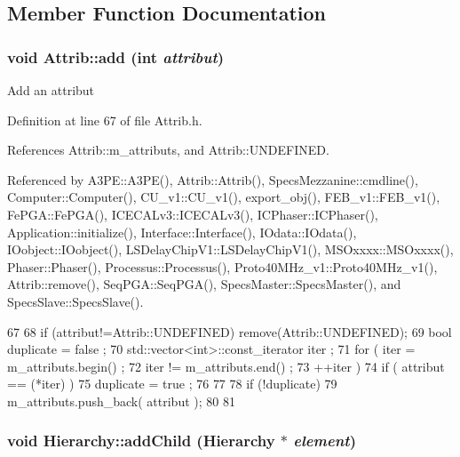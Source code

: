 \subsection{Member Function Documentation}
\hypertarget{classAttrib_a235f773af19c900264a190b00a3b4ad7}{
\subsubsection[{add}]{\setlength{\rightskip}{0pt plus 5cm}void Attrib::add (int {\em attribut})}}
\label{classAttrib_a235f773af19c900264a190b00a3b4ad7}
Add an attribut 

Definition at line 67 of file Attrib.h.

References Attrib::m\_\-attributs, and Attrib::UNDEFINED.

Referenced by A3PE::A3PE(), Attrib::Attrib(), SpecsMezzanine::cmdline(), Computer::Computer(), CU\_\-v1::CU\_\-v1(), export\_\-obj(), FEB\_\-v1::FEB\_\-v1(), FePGA::FePGA(), ICECALv3::ICECALv3(), ICPhaser::ICPhaser(), Application::initialize(), Interface::Interface(), IOdata::IOdata(), IOobject::IOobject(), LSDelayChipV1::LSDelayChipV1(), MSOxxxx::MSOxxxx(), Phaser::Phaser(), Processus::Processus(), Proto40MHz\_\-v1::Proto40MHz\_\-v1(), Attrib::remove(), SeqPGA::SeqPGA(), SpecsMaster::SpecsMaster(), and SpecsSlave::SpecsSlave().


\begin{DoxyCode}
67                             {
68     if (attribut!=Attrib::UNDEFINED) remove(Attrib::UNDEFINED);
69     bool duplicate = false ;
70     std::vector<int>::const_iterator iter ;
71     for ( iter  = m_attributs.begin() ;
72           iter != m_attributs.end()   ;
73           ++iter ) {
74       if ( attribut == (*iter) ) {
75         duplicate = true ;
76       }
77     }
78     if (!duplicate) {
79       m_attributs.push_back( attribut );
80     }
81   }
\end{DoxyCode}
\hypertarget{classHierarchy_ad677774ff38fcb257c04a3a10d471fac}{
\subsubsection[{addChild}]{\setlength{\rightskip}{0pt plus 5cm}void Hierarchy::addChild ({\bf Hierarchy} $\ast$ {\em element})}}
\label{classHierarchy_ad677774ff38fcb257c04a3a10d471fac}


